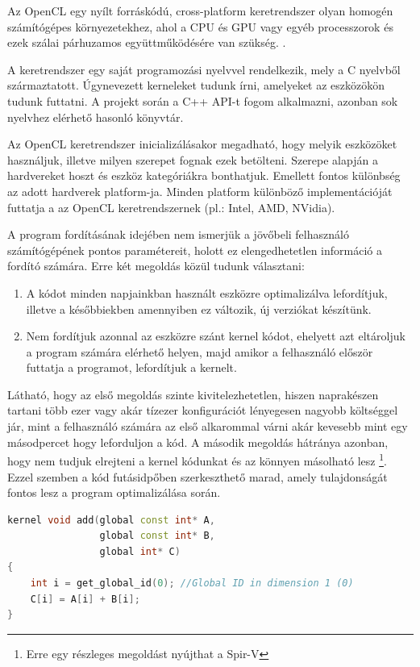 Az OpenCL egy nyílt forráskódú, cross-platform keretrendszer olyan homogén számítógépes környezetekhez, ahol a CPU és GPU vagy egyéb processzorok és ezek szálai párhuzamos együttműködésére van szükség. \cite{munshi2011OpenCL}.

A keretrendszer egy saját programozási nyelvvel rendelkezik, mely a C nyelvből származtatott. Úgynevezett kerneleket tudunk írni, amelyeket az eszközökön tudunk futtatni. A projekt során a C++ API-t fogom alkalmazni, azonban sok nyelvhez elérhető hasonló könyvtár.

Az OpenCL keretrendszer inicializálásakor megadható, hogy melyik eszközöket használjuk, illetve milyen szerepet fognak ezek betölteni. Szerepe alapján a hardvereket hoszt és eszköz kategóriákra bonthatjuk. Emellett fontos különbség az adott hardverek platform-ja. Minden platform különböző implementációját futtatja a az OpenCL keretrendszernek (pl.: Intel, AMD, NVidia).

A program fordításának idejében nem ismerjük a jövőbeli felhasználó számítógépének pontos paramétereit, holott ez elengedhetetlen információ a fordító számára. Erre két megoldás közül tudunk választani:
%
\begin{enumerate}
  \item A kódot minden napjainkban használt eszközre optimalizálva lefordítjuk, illetve a későbbiekben amennyiben ez változik, új verziókat készítünk.
  \item Nem fordítjuk azonnal az eszközre szánt kernel kódot, ehelyett azt eltároljuk a program számára elérhető helyen, majd amikor a felhasználó először futtatja a programot, lefordítjuk a kernelt.
\end{enumerate}


Látható, hogy az első megoldás szinte kivitelezhetetlen, hiszen naprakészen tartani több ezer vagy akár tízezer konfigurációt lényegesen nagyobb költséggel jár, mint a felhasználó számára az első alkarommal várni akár kevesebb mint egy másodpercet hogy leforduljon a kód. A második megoldás hátránya azonban, hogy nem tudjuk elrejteni a kernel kódunkat és az könnyen másolható lesz \footnote{Erre egy részleges megoldást nyújthat a Spir-V}. Ezzel szemben a kód futásidpőben szerkeszthető marad, amely tulajdonságát fontos lesz a program optimalizálása során.


\begin{lstlisting}[language={C++}]
kernel void add(global const int* A,
                global const int* B,
                global int* C)
{ 
    int i = get_global_id(0); //Global ID in dimension 1 (0)
    C[i] = A[i] + B[i]; 
}
\end{lstlisting}



